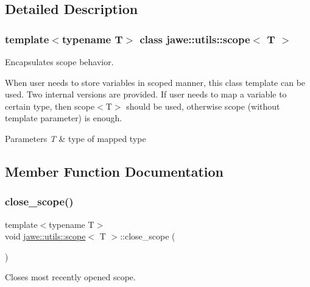 \subsection{Detailed Description}
\subsubsection*{template$<$typename T$>$\newline
class jawe\+::utils\+::scope$<$ T $>$}

Encapsulates scope behavior. 

When user needs to store variables in scoped manner, this class template can be used. Two internal versions are provided. If user needs to map a variable to certain type, then scope$<$\+T$>$ should be used, otherwise scope (without template parameter) is enough.


\begin{DoxyParams}{Parameters}
{\em T} & type of mapped type \\
\hline
\end{DoxyParams}


\subsection{Member Function Documentation}
\mbox{\label{classjawe_1_1utils_1_1scope_ac4bd45abba69e003aa37864ef5435288}} 
\subsubsection{\texorpdfstring{close\+\_\+scope()}{close\_scope()}}
{\footnotesize\ttfamily template$<$typename T$>$ \\
void \hyperlink{classjawe_1_1utils_1_1scope}{jawe\+::utils\+::scope}$<$ T $>$\+::close\+\_\+scope (\begin{DoxyParamCaption}{ }\end{DoxyParamCaption})\hspace{0.3cm}{\ttfamily [inline]}}

Closes most recently opened scope. \mbox{\label{classjawe_1_1utils_1_1scope_a97240fdcdf9b05029449ba0f652c3417}} 
